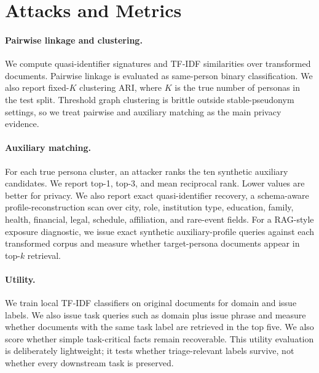 \documentclass[10pt,twocolumn]{article}
\begin{document}
\section{Attacks and Metrics}
\paragraph{Pairwise linkage and clustering.}
We compute quasi-identifier signatures and TF-IDF similarities over transformed documents.
Pairwise linkage is evaluated as same-person binary classification.
We also report fixed-$K$ clustering ARI, where $K$ is the true number of personas in the test split.
Threshold graph clustering is brittle outside stable-pseudonym settings, so we treat pairwise and auxiliary matching as the main privacy evidence.

\paragraph{Auxiliary matching.}
For each true persona cluster, an attacker ranks the ten synthetic auxiliary candidates.
We report top-1, top-3, and mean reciprocal rank.
Lower values are better for privacy.
We also report exact quasi-identifier recovery, a schema-aware profile-reconstruction scan over city, role, institution type, education, family, health, financial, legal, schedule, affiliation, and rare-event fields.
For a RAG-style exposure diagnostic, we issue exact synthetic auxiliary-profile queries against each transformed corpus and measure whether target-persona documents appear in top-$k$ retrieval.

\paragraph{Utility.}
We train local TF-IDF classifiers on original documents for domain and issue labels.
We also issue task queries such as domain plus issue phrase and measure whether documents with the same task label are retrieved in the top five.
We also score whether simple task-critical facts remain recoverable.
This utility evaluation is deliberately lightweight; it tests whether triage-relevant labels survive, not whether every downstream task is preserved.
\end{document}

